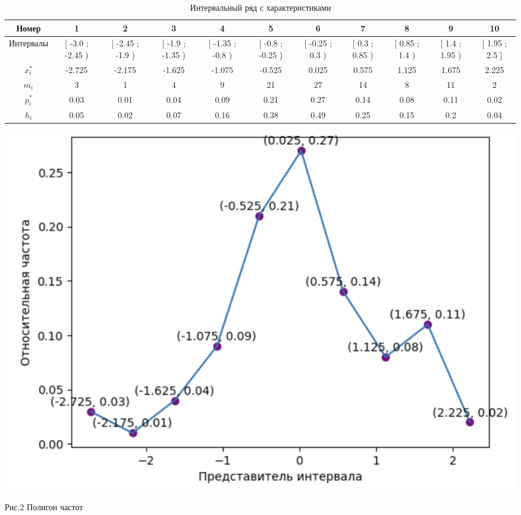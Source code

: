 \documentclass{article}
\begin{document}
\begin{table}[h]
    \scriptsize
    \begin{tabular}{|*{11}{c|}}
        \hline
        Номер & 1  & 2  & 3  & 4  & 5  & 6  & 7  & 8  & 9  & 10 \\
        \hline
        Интервалы &\tiny[ -3.0 ; -2.45 )& \tiny[ -2.45 ; -1.9 ) & \tiny[ -1.9 ; -1.35 ) & \tiny[ -1.35 ; -0.8 ) & \tiny[ -0.8 ; -0.25 ) & \tiny[ -0.25 ; 0.3 ) & \tiny[ 0.3 ; 0.85 ) & \tiny[ 0.85 ; 1.4 ) & \tiny[ 1.4 ; 1.95 ) & \tiny[ 1.95 ; 2.5 ] \\
        \hline
        $x_i^*$& -2.725 &-2.175 &-1.625 &-1.075 &-0.525 &0.025 &0.575 &1.125 &1.675 &2.225\\
        \hline
        $m_i$& 3 &1 &4 &9 &21 &27 &14 &8 &11 &2\\
        \hline
        $p_i^*$& 0.03 &0.01 &0.04 &0.09 &0.21 &0.27 &0.14 &0.08 &0.11 &0.02\\
        \hline
        $h_i$& 0.05 &0.02 &0.07 &0.16 &0.38 &0.49 &0.25 &0.15 &0.2 &0.04\\
        \hline
    \end{tabular}
    \caption{Интервальный ряд с характеристиками}
\end{table}



\begin{center}
    \includegraphics[width=.7\textwidth]{poligon.png}
\end{center} 

\begin{center}
    \small
    Рис.2 Полигон частот
\end{center} 
\newblock
\end{document}
